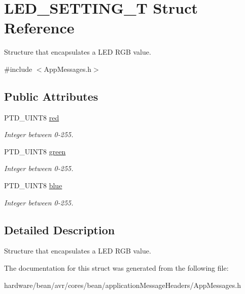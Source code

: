 \hypertarget{struct_l_e_d___s_e_t_t_i_n_g___t}{}\section{L\+E\+D\+\_\+\+S\+E\+T\+T\+I\+N\+G\+\_\+\+T Struct Reference}
\label{struct_l_e_d___s_e_t_t_i_n_g___t}


Structure that encapsulates a L\+E\+D R\+G\+B value.  




{\ttfamily \#include $<$App\+Messages.\+h$>$}

\subsection*{Public Attributes}
\begin{DoxyCompactItemize}
\item 
\hypertarget{struct_l_e_d___s_e_t_t_i_n_g___t_a4af1cfe5d52b72803f31f1aefeba4dad}{}P\+T\+D\+\_\+\+U\+I\+N\+T8 \hyperlink{struct_l_e_d___s_e_t_t_i_n_g___t_a4af1cfe5d52b72803f31f1aefeba4dad}{red}\label{struct_l_e_d___s_e_t_t_i_n_g___t_a4af1cfe5d52b72803f31f1aefeba4dad}

\begin{DoxyCompactList}\small\item\em Integer between 0-\/255. \end{DoxyCompactList}\item 
\hypertarget{struct_l_e_d___s_e_t_t_i_n_g___t_ab6d80e7108e2a40f38db65ed7d068284}{}P\+T\+D\+\_\+\+U\+I\+N\+T8 \hyperlink{struct_l_e_d___s_e_t_t_i_n_g___t_ab6d80e7108e2a40f38db65ed7d068284}{green}\label{struct_l_e_d___s_e_t_t_i_n_g___t_ab6d80e7108e2a40f38db65ed7d068284}

\begin{DoxyCompactList}\small\item\em Integer between 0-\/255. \end{DoxyCompactList}\item 
\hypertarget{struct_l_e_d___s_e_t_t_i_n_g___t_a453318108cb8ffe685e852435db2e48d}{}P\+T\+D\+\_\+\+U\+I\+N\+T8 \hyperlink{struct_l_e_d___s_e_t_t_i_n_g___t_a453318108cb8ffe685e852435db2e48d}{blue}\label{struct_l_e_d___s_e_t_t_i_n_g___t_a453318108cb8ffe685e852435db2e48d}

\begin{DoxyCompactList}\small\item\em Integer between 0-\/255. \end{DoxyCompactList}\end{DoxyCompactItemize}


\subsection{Detailed Description}
Structure that encapsulates a L\+E\+D R\+G\+B value. 

The documentation for this struct was generated from the following file\+:\begin{DoxyCompactItemize}
\item 
hardware/bean/avr/cores/bean/application\+Message\+Headers/App\+Messages.\+h\end{DoxyCompactItemize}
